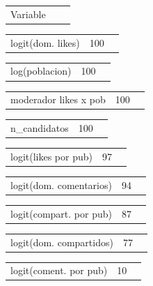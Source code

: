 \documentclass[11pt,a4paper]{article}
\begin{document}
{\begin{center}
\begin{tabular}{lll}
\hline
Variable & %
\hline
\end{tabular}
\end{center}
\begin{center}
\begin{tabular}{lll}
\hline
logit(dom. likes) & 100%
\hline
\end{tabular}
\end{center}
\begin{center}
\begin{tabular}{lll}
\hline
log(poblacion) & 100%
\hline
\end{tabular}
\end{center}
\begin{center}
\begin{tabular}{lll}
\hline
moderador likes x pob & 100%
\hline
\end{tabular}
\end{center}
\begin{center}
\begin{tabular}{lll}
\hline
n_candidatos & 100%
\hline
\end{tabular}
\end{center}
\begin{center}
\begin{tabular}{lll}
\hline
logit(likes por pub) & 97%
\hline
\end{tabular}
\end{center}
\begin{center}
\begin{tabular}{lll}
\hline
logit(dom. comentarios) & 94%
\hline
\end{tabular}
\end{center}
\begin{center}
\begin{tabular}{lll}
\hline
logit(compart. por pub) & 87%
\hline
\end{tabular}
\end{center}
\begin{center}
\begin{tabular}{lll}
\hline
logit(dom. compartidos) & 77%
\hline
\end{tabular}
\end{center}
\begin{center}
\begin{tabular}{lll}
\hline
logit(coment. por pub) & 10%
\hline
\end{tabular}
\end{center}

}
\end{document}
